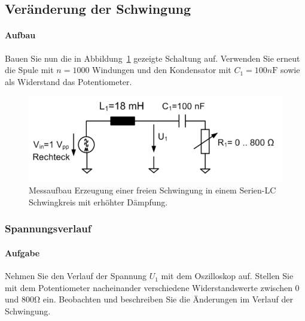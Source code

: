 \documentclass[10pt]{scrreprt}
\begin{document}
        \subsection{Veränderung der Schwingung}
        \paragraph{Aufbau}
        Bauen Sie nun die in Abbildung~\ref{fig:abb17} gezeigte Schaltung auf. Verwenden Sie erneut
        die Spule mit $n = 1000$ Windungen und den Kondensator mit $C_1 = 100\si{n\farad}$ sowie
        als Widerstand das Potentiometer.
        \begin{center}
            \begin{figure}[H]
                \includegraphics[width=\textwidth]{Abbildung17.png}
                \caption{Messaufbau Erzeugung einer freien Schwingung in einem Serien-LC Schwingkreis
                        mit erhöhter Dämpfung.}
                \label{fig:abb17}
            \end{figure}
        \end{center}

        \subsubsection{Spannungsverlauf}
        \paragraph{Aufgabe}
        Nehmen Sie den Verlauf der Spannung $U_1$ mit dem Oszilloskop auf. Stellen Sie
        mit dem Potentiometer nacheinander verschiedene Widerstandswerte zwischen
        $0$ und $800\si{\ohm}$ ein. Beobachten und beschreiben Sie die Änderungen im Verlauf
        der Schwingung.
\end{document}
